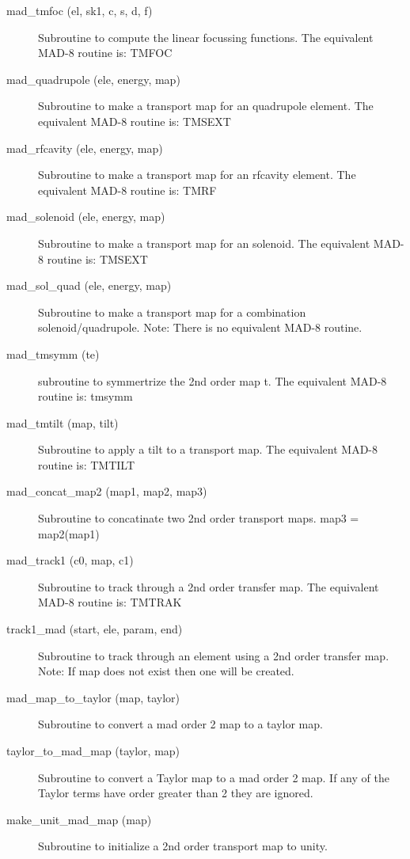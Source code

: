 \begin{description}
\item[mad\_tmfoc (el, sk1, c, s, d, f) ] \Newline 
     Subroutine to compute the linear focussing functions.  
     The equivalent MAD-8 routine is: TMFOC

\item[mad\_quadrupole (ele, energy, map)] \Newline 
     Subroutine to make a transport map for an quadrupole element.
     The equivalent MAD-8 routine is: TMSEXT

\item[mad\_rfcavity (ele, energy, map)] \Newline 
     Subroutine to make a transport map for an rfcavity element.
     The equivalent MAD-8 routine is: TMRF

\item[mad\_solenoid (ele, energy, map)] \Newline 
     Subroutine to make a transport map for an solenoid.
     The equivalent MAD-8 routine is: TMSEXT

\item[mad\_sol\_quad (ele, energy, map)] \Newline 
     Subroutine to make a transport map for a combination solenoid/quadrupole.
     Note: There is no equivalent MAD-8 routine.

\item[mad\_tmsymm (te)] \Newline 
     subroutine to symmertrize the 2nd order map t.
     The equivalent MAD-8 routine is: tmsymm

\item[mad\_tmtilt (map, tilt)] \Newline 
     Subroutine to apply a tilt to a transport map.
     The equivalent MAD-8 routine is: TMTILT

\item[mad\_concat\_map2 (map1, map2, map3)] \Newline 
     Subroutine to concatinate two 2nd order transport maps.
         map3 = map2(map1)

\item[mad\_track1 (c0, map, c1)] \Newline 
     Subroutine to track through a 2nd order transfer map.
     The equivalent MAD-8 routine is: TMTRAK

\item[track1\_mad (start, ele, param, end)] \Newline 
     Subroutine to track through an element using a 2nd order transfer map.
     Note: If map does not exist then one will be created. 

\item[mad\_map\_to\_taylor (map, taylor)] \Newline 
     Subroutine to convert a mad order 2 map to a taylor map.

\item[taylor\_to\_mad\_map (taylor, map)] \Newline 
     Subroutine to convert a Taylor map to a mad order 2 map.
     If any of the Taylor terms have order greater than 2 they are ignored.

\item[make\_unit\_mad\_map (map)] \Newline 
     Subroutine to initialize a 2nd order transport map to unity.


\end{description}

